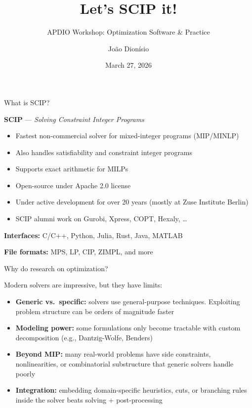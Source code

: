 \documentclass{beamer}
\title{Let's SCIP it!}
\subtitle{APDIO Workshop: Optimization Software \& Practice}
\author{Jo\~{a}o Dion\'{i}sio}
\date{March 27, 2026}
\begin{document}
\begin{frame}
  \maketitle
\end{frame}

\begin{frame}{What is SCIP?}

\textbf{SCIP} --- \emph{Solving Constraint Integer Programs}

\medskip
\begin{itemize}
  \item Fastest non-commercial solver for mixed-integer programs (MIP/MINLP)
  \item Also handles satisfiability and constraint integer programs
  \item Supports exact arithmetic for MILPs
  \item Open-source under Apache 2.0 license
  \item Under active development for over 20 years (mostly at Zuse Institute Berlin)
  \item SCIP alumni work on Gurobi, Xpress, COPT, Hexaly, \ldots
\end{itemize}

\bigskip
\textbf{Interfaces:} C/C++, Python, Julia, Rust, Java, MATLAB

\bigskip
\textbf{File formats:} MPS, LP, CIP, ZIMPL, and more
\end{frame}


\begin{frame}{Why do research on optimization?}

Modern solvers are impressive, but they have limits:

\medskip
\begin{itemize}
  \item \textbf{Generic vs.\ specific:} solvers use general-purpose techniques. Exploiting problem structure can be orders of magnitude faster
  \item \textbf{Modeling power:} some formulations only become tractable with custom decomposition (e.g., Dantzig-Wolfe, Benders)
  \item \textbf{Beyond MIP:} many real-world problems have side constraints, nonlinearities, or combinatorial substructure that generic solvers handle poorly
  \item \textbf{Integration:} embedding domain-specific heuristics, cuts, or branching rules inside the solver beats solving + post-processing
\end{itemize}

\end{frame}
\end{document}
